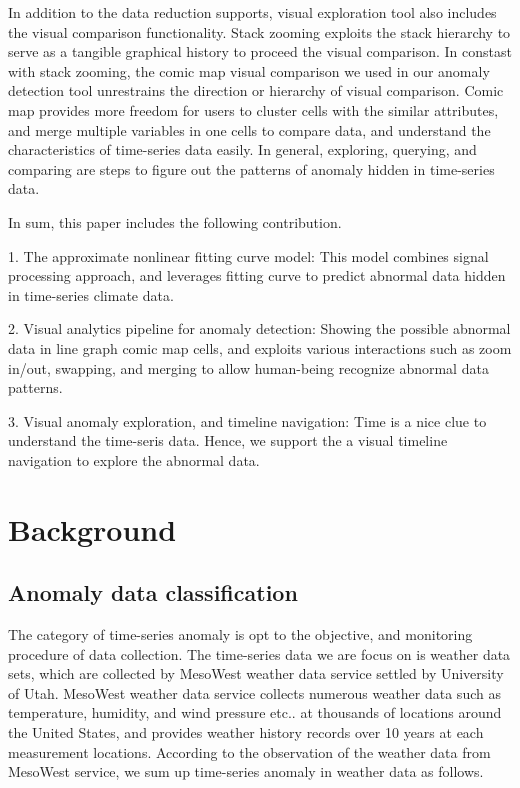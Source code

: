 \documentclass{vgtc}                          %
\begin{document}
	In addition to the data reduction supports, visual exploration tool also includes the visual comparison functionality. Stack zooming \cite{javed2010stack} exploits the stack hierarchy to serve as a tangible graphical history to proceed the visual comparison. In constast with stack zooming, the comic map visual comparison we used in our anomaly detection tool unrestrains the direction or hierarchy of visual comparison. Comic map provides more freedom for users to cluster cells with the similar attributes, and merge multiple variables in one cells to compare data, and understand the characteristics of time-series data easily. In general, exploring, querying, and comparing are steps to figure out the patterns of anomaly hidden in time-series data.
		
In sum, this paper includes the following contribution. 

1. The approximate nonlinear fitting curve model: This model combines signal processing approach, and leverages fitting curve to predict abnormal data hidden in time-series climate data.  
 
2. Visual analytics pipeline for anomaly detection: Showing the possible abnormal data in line graph comic map cells, and exploits various interactions such as zoom in/out, swapping, and merging to allow human-being recognize abnormal data patterns.

3. Visual anomaly exploration, and timeline navigation: Time is a nice clue to understand the time-seris data. Hence, we support the a visual timeline navigation to explore the abnormal data.    

\section{Background}

\subsection{Anomaly data classification}

The category of time-series anomaly is opt to the objective, and monitoring procedure of data collection. The time-series data we are focus on is weather data sets, which are collected by MesoWest weather data service settled by University of Utah. MesoWest weather data service collects numerous weather data such as temperature, humidity, and wind pressure etc.. at thousands of locations around the United States, and provides weather history records over 10 years at each measurement locations. According to the observation of the weather data from MesoWest service, we sum up time-series anomaly in weather data as follows.
\end{document}
